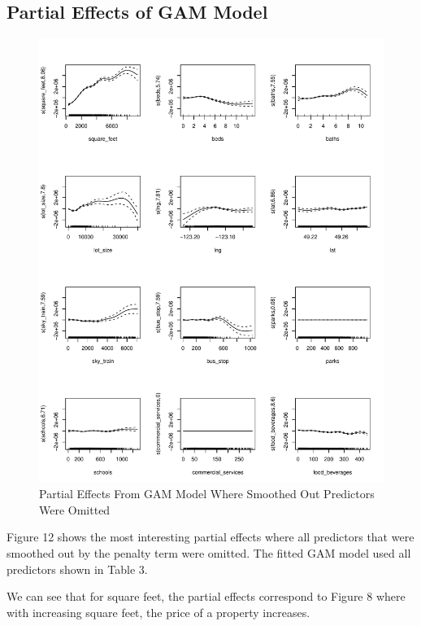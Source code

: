 \documentclass[
]{article}
\begin{document}
\hypertarget{partial-effects-of-gam-model}{%
\subsection{Partial Effects of GAM
Model}\label{partial-effects-of-gam-model}}

\begin{figure}
\centering
\includegraphics{final_report_files/figure-latex/unnamed-chunk-17-1.pdf}
\caption{Partial Effects From GAM Model Where Smoothed Out Predictors
Were Omitted}
\end{figure}

Figure 12 shows the most interesting partial effects where all
predictors that were smoothed out by the penalty term were omitted. The
fitted GAM model used all predictors shown in Table 3.

We can see that for square feet, the partial effects correspond to
Figure 8 where with increasing square feet, the price of a property
increases.
\end{document}
